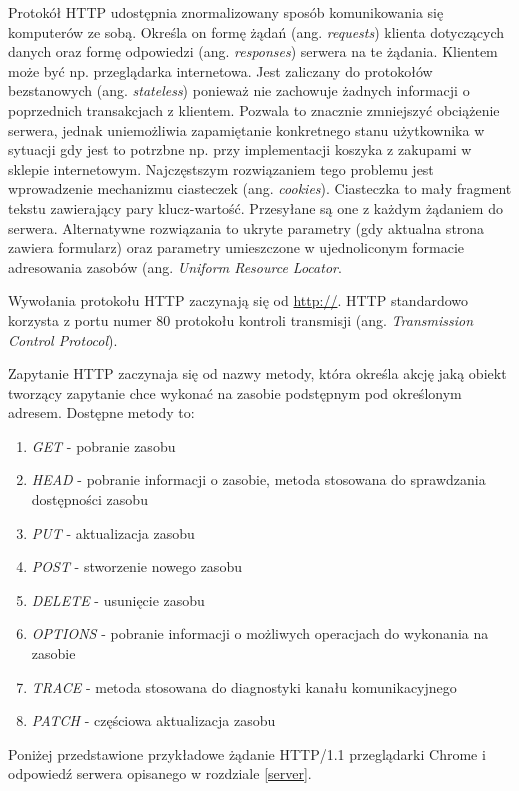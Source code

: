\documentclass[polish, twoside, 12pt]{mwart}
\begin{document}
Protokół HTTP udostępnia znormalizowany sposób komunikowania się komputerów ze sobą. Określa on formę żądań (ang. \emph{requests}) klienta dotyczących danych oraz formę odpowiedzi (ang. \emph{responses}) serwera na te żądania. Klientem może być np. przeglądarka internetowa. Jest zaliczany do protokołów bezstanowych (ang. \emph{stateless}) ponieważ nie zachowuje żadnych informacji o poprzednich transakcjach z klientem. Pozwala to znacznie zmniejszyć obciążenie serwera, jednak uniemożliwia zapamiętanie konkretnego stanu użytkownika w sytuacji gdy jest to potrzbne np. przy implementacji koszyka z zakupami w sklepie internetowym. Najczęstszym rozwiązaniem tego problemu jest wprowadzenie mechanizmu ciasteczek (ang. \emph{cookies}). Ciasteczka to mały fragment tekstu zawierający pary klucz-wartość. Przesyłane są one z każdym żądaniem do serwera. Alternatywne rozwiązania to ukryte parametry (gdy aktualna strona zawiera formularz) oraz parametry umieszczone w ujednoliconym formacie adresowania zasobów (ang. \emph{Uniform Resource Locator}.

Wywołania protokołu HTTP zaczynają się od \url{http://}. HTTP standardowo korzysta z portu numer 80 protokołu kontroli transmisji (ang. \emph{Transmission Control Protocol}).

Zapytanie HTTP zaczynaja się od nazwy metody, która określa akcję jaką obiekt tworzący zapytanie chce wykonać na zasobie podstępnym pod określonym adresem. Dostępne metody to:

\begin{enumerate}
  \item \emph{GET} - pobranie zasobu
  \item \emph{HEAD} - pobranie informacji o zasobie, metoda stosowana do sprawdzania dostępności zasobu
  \item \emph{PUT} - aktualizacja zasobu
  \item \emph{POST} - stworzenie nowego zasobu
  \item \emph{DELETE} - usunięcie zasobu
  \item \emph{OPTIONS} - pobranie informacji o możliwych operacjach do wykonania na zasobie
  \item \emph{TRACE} - metoda stosowana do diagnostyki kanału komunikacyjnego
  \item \emph{PATCH} - częściowa aktualizacja zasobu
\end{enumerate}

Poniżej przedstawione przykładowe żądanie HTTP/1.1 przeglądarki Chrome i odpowiedź serwera opisanego w rozdziale \ref{server}.
\end{document}
